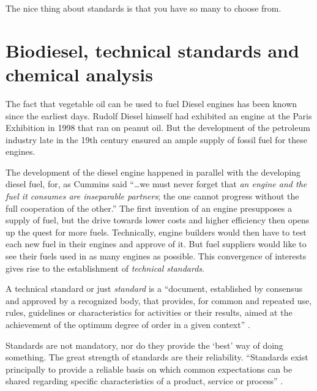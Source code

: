 
\begin{savequote}[60mm]
The nice thing about standards is that you have so many to choose from.
\end{savequote}


\chapter[Biodiesel standards]{Biodiesel, technical standards and chemical analysis} %

\label{Chapter3} %

The fact that vegetable oil can be used to fuel Diesel engines has been known
since the earliest days. Rudolf Diesel himself had exhibited an engine at the
Paris Exhibition in 1998  that ran on peanut
oil. But the development of the petroleum industry late in the 19th century
ensured an ample supply of fossil fuel for these engines.

The development of the diesel engine happened in parallel with the developing
diesel fuel, for, as Cummins said \autocite{Cummins1989}``\ldots we must never
forget that \textit{an engine and the fuel it consumes are inseparable
partners}; the one cannot progress without the full cooperation of the other.''
The first invention of an engine presupposes a supply of fuel, but the drive
towards lower costs and higher efficiency then opens up the quest for more
fuels. Technically, engine builders would then have to test each new fuel in
their engines and approve of it. But fuel suppliers would like to see their
fuels used in as many engines as possible. This convergence of interests gives
rise to the establishment of \textit{technical standards}.

A technical standard or just \textit{standard} is a ``document, established by
consensus and approved by a recognized body, that provides, for common and
repeated use, rules, guidelines or characteristics for activities or their
results, aimed at the achievement of the optimum degree of order in a given
context'' \autocite{Hatto2010}. 

Standards are not mandatory, nor do they provide the `best' way of doing
something. The great strength of standards are their reliability.
``Standards exist principally to provide a reliable basis on which common
expectations can be shared regarding specific characteristics of a product,
service or process'' \autocite{BSI2016}.

